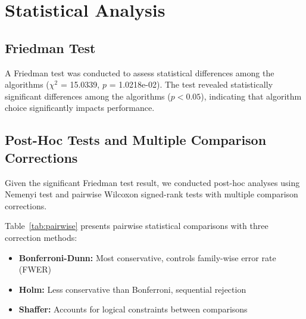 \documentclass[conference]{IEEEtran}
\begin{document}
\section{Statistical Analysis}

\subsection{Friedman Test}

A Friedman test was conducted to assess statistical differences among the algorithms ($\chi^2$ = 15.0339, $p$ = 1.0218e-02). The test revealed statistically significant differences among the algorithms ($p < 0.05$), indicating that algorithm choice significantly impacts performance.

\subsection{Post-Hoc Tests and Multiple Comparison Corrections}

Given the significant Friedman test result, we conducted post-hoc analyses using Nemenyi test and pairwise Wilcoxon signed-rank tests with multiple comparison corrections.

Table~\ref{tab:pairwise} presents pairwise statistical comparisons with three correction methods:
\begin{itemize}
\item \textbf{Bonferroni-Dunn:} Most conservative, controls family-wise error rate (FWER)
\item \textbf{Holm:} Less conservative than Bonferroni, sequential rejection
\item \textbf{Shaffer:} Accounts for logical constraints between comparisons
\end{itemize}
\end{document}
